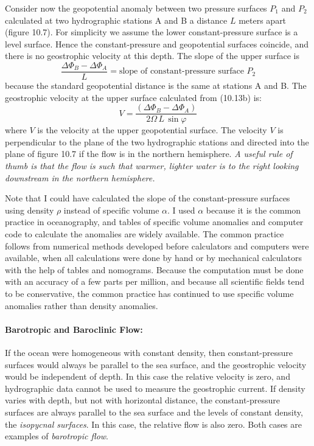 Consider now the geopotential anomaly between two pressure surfaces
$P_1$ and $P_2$ calculated at two hydrographic
stations A and B a distance $L$ meters
apart (figure 10.7). For simplicity we assume the lower
constant-pressure surface is a level surface. Hence the constant-pressure and geopotential surfaces
coincide, and there is no geostrophic velocity at this depth. The
slope of the upper surface is
\begin{displaymath}
\frac{\Delta\Phi_B - \Delta\Phi_A}{L} =\text{slope of constant-pressure
surface $P_2$}
\end{displaymath}
because the standard geopotential distance is the same at stations A
and B. The geostrophic velocity at the
upper surface calculated from (10.13b) is:
\begin{equation}
V =\frac{\left(\Delta\Phi_B - \Delta\Phi_A\right)}{2\Omega\,L\, \sin\varphi }
\end{equation}
where $V$ is the velocity at the upper geopotential surface. The
velocity $V$ is perpendicular to the plane of the two hydrographic
stations and directed into the plane of
figure 10.7 if the flow is in the northern hemisphere. \textit{A
  useful rule of thumb is that the flow is such that warmer, lighter
  water is to the right looking downstream in the northern
  hemisphere.}

Note that I could have calculated the slope of the constant-pressure
surfaces using density $\rho$ instead of specific volume $\alpha$. I
used $\alpha$ because it is the common practice in oceanography, and
tables of specific volume anomalies
and computer code to calculate the anomalies are widely available. The
common practice follows from numerical methods developed before
calculators and computers were available, when all calculations were
done by hand or by mechanical calculators with the help of tables and
nomograms. Because the computation must be done with an
accuracy of a few parts per million, and
because all scientific fields tend to be conservative, the common
practice has continued to use specific volume anomalies rather than
density anomalies.

\paragraph{Barotropic and Baroclinic Flow:}
If the ocean were homogeneous with constant density, then
constant-pressure surfaces would always be parallel to the sea
surface, and the geostrophic velocity would be independent of
depth. In this case the relative velocity is zero, and hydrographic
data cannot be used
to measure the geostrophic current. If density varies with depth, but
not with horizontal distance, the constant-pressure surfaces are
always parallel to the sea surface and the levels of constant density,
the \textit{isopycnal surfaces}. In
this case, the relative flow is also zero. Both cases are examples of
\textit{barotropic flow}.

